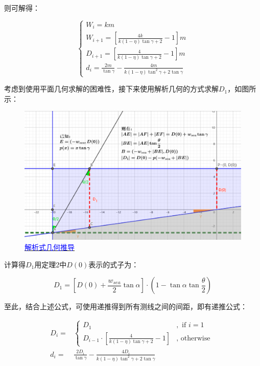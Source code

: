 则可解得：

\begin{equation}
    \begin{cases}
        W_i = km                                                             \\
        W_{i + 1} = \left[\frac{4k}{k(1 - \eta) \tan \gamma + 2} - 1\right]m \\
        D_{i + 1} = \left[\frac{4}{k(1 - \eta) \tan \gamma + 2} - 1\right]m  \\
        d_i = \frac{2m}{\tan \gamma} - \frac{4m}{k(1-\eta) \tan^2 \gamma + 2 \tan \gamma}
    \end{cases}
\end{equation}

考虑到使用平面几何求解的困难性，接下来使用解析几何的方式求解$D_1$，如图所示：

\begin{figure}[h]
    \centering
    \includegraphics[scale=0.3]{res/img/解析式几何推导.png}
    \caption{\href{https://www.geogebra.org/m/ycxg4tw9}{\textcolor{blue}{解析式几何推导}}}
    \label{fig:解析式几何推导}
\end{figure}

计算得$D_1$用定理2中$D(0)$表示的式子为：

\begin{equation}
    D_1 = \left[ D(0) + \frac{w_{sea}}{2} \tan \alpha \right] \cdot \left( 1 - \tan \alpha \tan \frac{\theta}{2} \right)
\end{equation}

至此，结合上述公式，可使用递推得到所有测线之间的间距，即有递推公式：

\begin{align}
    D_{i} = & \begin{cases}
                  D_1                                                                    &, \text{ if } i = 1  \\
                  D_{i - 1} \cdot \left[\frac{4}{k(1 - \eta) \tan \gamma + 2} - 1\right] &, \text{ otherwise }
              \end{cases} \\
    d_i =   & \frac{2D_i}{\tan \gamma} - \frac{4D_i}{k(1-\eta) \tan^2 \gamma + 2 \tan \gamma}
\end{align}

